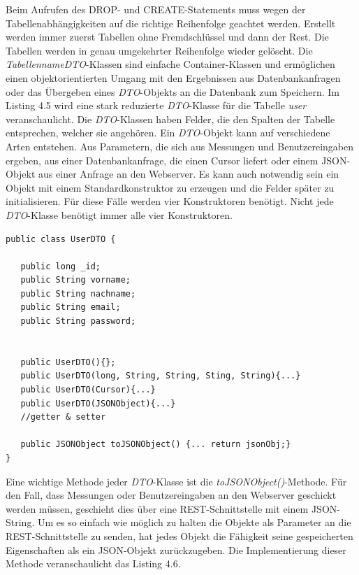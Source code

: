 Beim Aufrufen des DROP- und CREATE-Statements muss wegen der Tabellenabh\"angigkeiten auf die richtige Reihenfolge geachtet werden.
Erstellt werden immer zuerst Tabellen ohne Fremdschl\"ussel und dann der Rest.
Die Tabellen werden in genau umgekehrter Reihenfolge wieder gel\"oscht.
Die \emph{TabellennameDTO}-Klassen sind einfache Container-Klassen und erm\"oglichen einen objektorientierten Umgang mit den Ergebnissen aus Datenbankanfragen oder 
das \"Ubergeben eines \emph{DTO}-Objekts an die Datenbank zum Speichern.
Im Listing 4.5 wird eine stark reduzierte \emph{DTO}-Klasse f\"ur die Tabelle \emph{user} veranschaulicht.
Die \emph{DTO}-Klassen haben Felder, die den Spalten der Tabelle entsprechen, welcher sie angeh\"oren.
Ein \emph{DTO}-Objekt kann auf verschiedene Arten entstehen.
Aus Parametern, die sich aus Messungen und Benutzereingaben ergeben, 
aus einer Datenbankanfrage, die einen Cursor liefert oder einem JSON-Objekt aus einer Anfrage an den Webserver.
Es kann auch notwendig sein ein Objekt mit einem Standardkonstruktor zu erzeugen und die Felder sp\"ater zu initialisieren.
F\"ur diese F\"alle werden vier Konstruktoren ben\"otigt.
Nicht jede \emph{DTO}-Klasse ben\"otigt immer alle vier Konstruktoren.\\

\begin{lstlisting}[caption={\emph{UserDTO}-Klasse in leicht reduzierter Form}]
public class UserDTO {

   public long _id;
   public String vorname;
   public String nachname;
   public String email;
   public String password;
   
   
   public UserDTO(){};
   public UserDTO(long, String, String, Sting, String){...}
   public UserDTO(Cursor){...}
   public UserDTO(JSONObject){...}
   //getter & setter
   
   public JSONObject toJSONObject() {... return jsonObj;}
}
\end{lstlisting}

Eine wichtige Methode jeder \emph{DTO}-Klasse ist die \emph{toJSONObject()}-Methode.
F\"ur den Fall, dass Messungen oder Benutzereingaben an den Webserver geschickt werden m\"ussen,
geschieht dies \"uber eine REST-Schnittstelle mit einem JSON-String.
Um es so einfach wie m\"oglich zu halten die Objekte als Parameter an die REST-Schnittstelle zu senden,
hat jedes Objekt die F\"ahigkeit seine gespeicherten Eigenschaften als ein JSON-Objekt zur\"uckzugeben.
Die Implementierung dieser Methode veranschaulicht das Listing 4.6.\\

